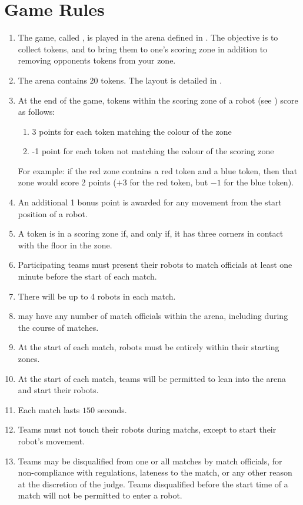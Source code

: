 \section{Game Rules}
\label{sec:rules}

\begin{enumerate}
  \item The game, called \emph{\gamename}, is played in the arena defined in
        . The objective is to collect tokens, and to bring
        them to one's scoring zone in addition to removing opponents tokens from
        your zone.
  \item The arena contains 20 tokens. The layout is detailed in
        .
  \item At the end of the game, tokens within the scoring zone of a robot (see
        ) score as follows:
    \begin{enumerate}
      \item 3 points for each token matching the colour of the zone
      \item -1 point for each token not matching the colour of the scoring zone
    \end{enumerate}
        For example: if the red zone contains a red token and a blue token, then
        that zone would score 2 points ($+3$ for the red token, but $-1$ for the
        blue token).
  \item An additional 1 bonus point is awarded for any movement from the
        start position of a robot.
  \item \label{rules:token}A token is in a scoring zone if, and only if, it
        has three corners in contact with the floor in the zone.
  \item Participating teams must present their robots to match officials at
        least one minute before the start of each match.
  \item There will be up to 4 robots in each match.
  \item \org may have any number of match officials within the arena, including
        during the course of matches.
  \item At the start of each match, robots must be entirely within their
        starting zones.
  \item At the start of each match, teams will be permitted to lean into the
        arena and start their robots.
  \item Each match lasts $150$ seconds.
  \item Teams must not touch their robots during matchs, except to start their
        robot's movement.
  \item Teams may be disqualified from one or all matches by match officials,
        for non-compliance with regulations, lateness to the match, or any other
        reason at the discretion of the judge. Teams disqualified before the
        start time of a match will not be permitted to enter a robot.
\end{enumerate}

